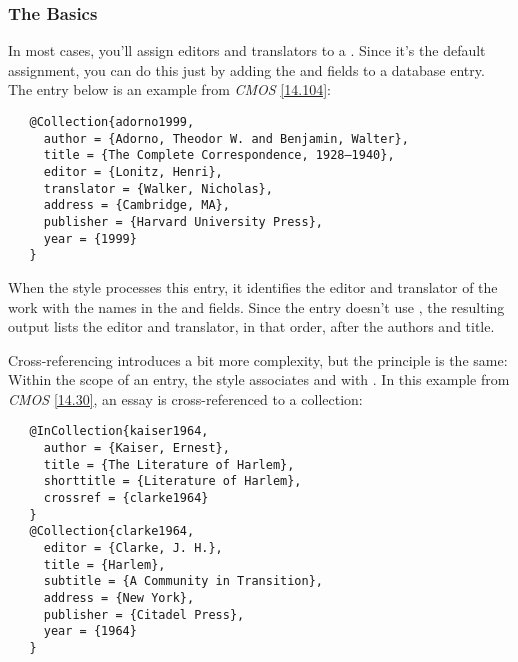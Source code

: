 \documentclass[11pt,letterpaper,oneside]{article}
\begin{document}
\subsubsection{The Basics}
\label{editors:basics}

In most cases, you'll assign editors and translators to a
. Since it's the default assignment, you can do this
just by adding the  and  fields
to a database entry. The entry below is an example from \textit{CMOS}
\ref{14.104}:

\begin{verbatim}
   @Collection{adorno1999,
     author = {Adorno, Theodor W. and Benjamin, Walter},
     title = {The Complete Correspondence, 1928–1940},
     editor = {Lonitz, Henri},
     translator = {Walker, Nicholas},
     address = {Cambridge, MA},
     publisher = {Harvard University Press},
     year = {1999}
   }
\end{verbatim}

\begin{citebib}
\item \cite{adorno1999}
\end{citebib}

\noindent When the style processes this entry, it identifies the
editor and translator of the work with the names in the
 and  fields. Since the entry
doesn't use , the resulting output lists the editor and
translator, in that order, after the authors and title.

Cross-referencing introduces a bit more complexity, but the principle
is the same: Within the scope of an entry, the style associates
 and  with . In
this example from \textit{CMOS} \ref{14.30}, an essay is
cross-referenced to a collection:

\begin{verbatim}
   @InCollection{kaiser1964,
     author = {Kaiser, Ernest},
     title = {The Literature of Harlem},
     shorttitle = {Literature of Harlem},
     crossref = {clarke1964}
   }
   @Collection{clarke1964,
     editor = {Clarke, J. H.},
     title = {Harlem},
     subtitle = {A Community in Transition},
     address = {New York},
     publisher = {Citadel Press},
     year = {1964}
   }
\end{verbatim}

\begin{citebib}
\item \cite{kaiser1964}
\end{citebib}
\end{document}
